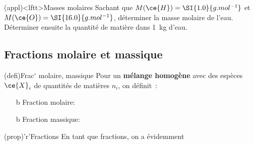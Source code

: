 \documentclass[../../main/main.tex]{subfiles}
\begin{document}

\begin{tcb}[label=exem:massemol, breakable](appl)<lftt>{Masses molaires}
	Sachant que $M(\ce{H}) = \SI{1.0}{g.mol^{-1}}$ et $M(\ce{O}) =
		\SI{16.0}{g.mol^{-1}}$, déterminer la masse molaire de l'eau. Déterminer
	ensuite la quantité de matière dans \SI{1}{kg} d'eau.
	\tcblower
	\begin{isd}
		\vspace{-15pt}
		\tcblower
		\vspace{-15pt}
	\end{isd}
\end{tcb}

\subsection{Fractions molaire et massique}
\begin{tcbraster}[raster columns=10, raster equal height=rows]
	\begin{tcb*}[label=def:fractionsmolmass, raster multicolumn=6,
			list entry={\lte\thedefi~:~Fractions molaire et massique}
		]
		(defi){Frac$^\circ$ molaire, massique}
		Pour un \textbf{mélange homogène} avec des espèces $\ce{X}_i$ de quantités
		de matières $n_i$, on définit~:
		\begin{itemize}
			\item[b]{Fraction molaire}:
			\item[b]{Fraction massique}:
		\end{itemize}
	\end{tcb*}
	\begin{tcb}[raster multicolumn=4](prop)'r'{Fractions}
		En tant que fractions, on a évidemment
		\psw{%
			\[
				\boxed{\sum x_i = 1 = \sum w_i}
			\]
		}%
	\end{tcb}
\end{tcbraster}
\end{document}
